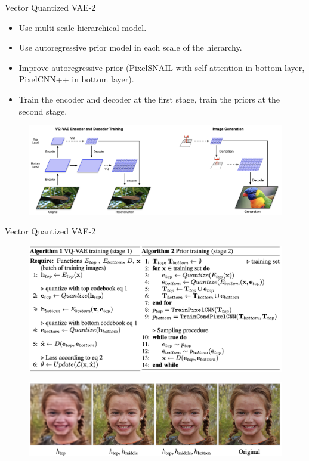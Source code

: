 \begin{frame}{Vector Quantized VAE-2}
	\begin{itemize}
		\item Use multi-scale hierarchical model.
		\item Use autoregressive prior model in each scale of the hierarchy.
		\item Improve autoregressive prior (PixelSNAIL with self-attention in bottom layer, PixelCNN++ in bottom layer).
		\item Train the encoder and decoder at the first stage, train the priors at the second stage.
	\end{itemize}
	\begin{figure}
		\centering
		\includegraphics[width=\linewidth]{figs/vqvae2}
	\end{figure}
\end{frame}
\begin{frame}{Vector Quantized VAE-2}
		\begin{figure}
			\centering
			\includegraphics[width=0.9\linewidth]{figs/vqvae2_pseudo}
		\end{figure}
		\vspace{-0.2cm}
		\begin{figure}
			\centering
			\includegraphics[width=0.85\linewidth]{figs/vqvae2_latents}
		\end{figure}
\end{frame}
